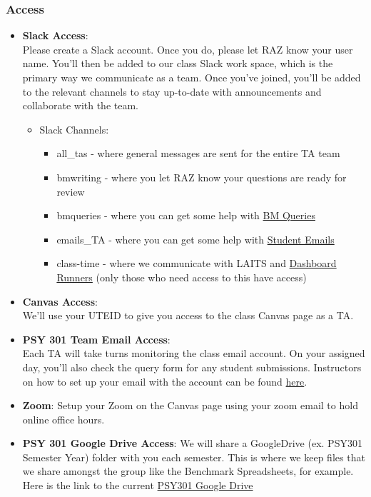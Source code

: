 \documentclass[
]{article}
\providecommand{\tightlist}{%
  \setlength{\itemsep}{0pt}\setlength{\parskip}{0pt}}
\begin{document}
\hypertarget{access}{%
\subsubsection{Access}\label{access}}

\begin{itemize}
\item
  \textbf{Slack Access}:\\
  Please create a Slack account. Once you do, please let RAZ know your user name. You'll then be added to our class Slack work space, which is the primary way we communicate as a team. Once you've joined, you'll be added to the relevant channels to stay up-to-date with announcements and collaborate with the team.

  \begin{itemize}
  \tightlist
  \item
    Slack Channels:

    \begin{itemize}
    \tightlist
    \item
      all\_tas - where general messages are sent for the entire TA team
    \item
      bmwriting - where you let RAZ know your questions are ready for review
    \item
      bmqueries - where you can get some help with \protect\hyperlink{benchmark-queries}{BM Queries}
    \item
      emails\_TA - where you can get some help with \protect\hyperlink{emails}{Student Emails}
    \item
      class-time - where we communicate with LAITS and \protect\hyperlink{dashboard-runner}{Dashboard Runners} (only those who need access to this have access)
    \end{itemize}
  \end{itemize}
\item
  \textbf{Canvas Access}:\\
  We'll use your UTEID to give you access to the class Canvas page as a TA.
\item
  \textbf{PSY 301 Team Email Access}:\\
  Each TA will take turns monitoring the class email account. On your assigned day, you'll also check the query form for any student submissions. Instructors on how to set up your email with the account can be found \protect\hyperlink{setting-up-your-account}{here}.
\item
  \textbf{Zoom}:
  Setup your Zoom on the Canvas page using your zoom email to hold online office hours.
\item
  \textbf{PSY 301 Google Drive Access}:
  We will share a GoogleDrive (ex. PSY301 Semester Year) folder with you each semester. This is where we keep files that we share amongst the group like the Benchmark Spreadsheets, for example. Here is the link to the current \href{https://drive.google.com/drive/u/2/folders/1YuG-BCR5GXmraqYFyV0Oolhz4i2TopO8}{PSY301 Google Drive}
\end{itemize}
\end{document}
